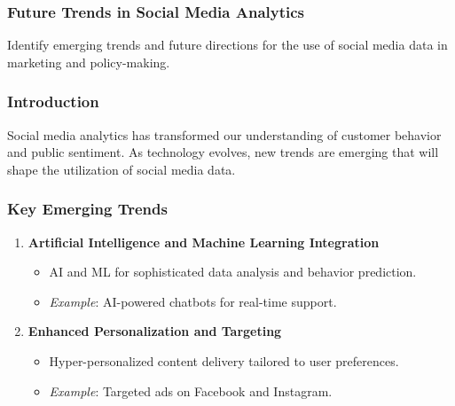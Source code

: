 \documentclass{beamer}
\begin{document}
\begin{frame}[fragile]
    \frametitle{Future Trends in Social Media Analytics}
    Identify emerging trends and future directions for the use of social media data in marketing and policy-making.
\end{frame}

\begin{frame}[fragile]
    \frametitle{Introduction}
    Social media analytics has transformed our understanding of customer behavior and public sentiment. As technology evolves, new trends are emerging that will shape the utilization of social media data. 
\end{frame}

\begin{frame}[fragile]
    \frametitle{Key Emerging Trends}
    \begin{enumerate}
        \item \textbf{Artificial Intelligence and Machine Learning Integration}
        \begin{itemize}
            \item AI and ML for sophisticated data analysis and behavior prediction.
            \item \textit{Example}: AI-powered chatbots for real-time support.
        \end{itemize}

        \item \textbf{Enhanced Personalization and Targeting}
        \begin{itemize}
            \item Hyper-personalized content delivery tailored to user preferences.
            \item \textit{Example}: Targeted ads on Facebook and Instagram.
        \end{itemize}
    \end{enumerate}
\end{frame}
\end{document}
